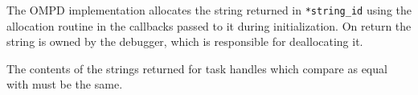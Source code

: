 The OMPD implementation allocates the string returned in \texttt{*string\_id}
using the allocation routine in the callbacks passed to it
during initialization.
On return the string is owned by the debugger, which is responsible
for deallocating it.

The contents of the strings returned for task handles
which compare as equal with
must be the same.
